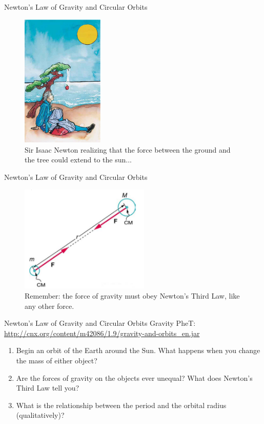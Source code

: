 \documentclass{beamer}
\begin{document}
\begin{frame}{Newton's Law of Gravity and Circular Orbits}
\begin{figure}
\centering
\includegraphics[width=0.35\textwidth]{figures/newton.png}
\caption{\label{fig:apple} Sir Isaac Newton realizing that the force between the ground and the tree could extend to the sun...}
\end{figure}
\end{frame}

\begin{frame}{Newton's Law of Gravity and Circular Orbits}
\begin{figure}
\centering
\includegraphics[width=0.55\textwidth]{figures/third.png}
\caption{\label{fig:third} Remember: the force of gravity must obey Newton's Third Law, like any other force.}
\end{figure}
\end{frame}

\begin{frame}{Newton's Law of Gravity and Circular Orbits}
Gravity PheT: \\
\url{http://cnx.org/content/m42086/1.9/gravity-and-orbits_en.jar}
\begin{enumerate}
\item Begin an orbit of the Earth around the Sun.  What happens when you change the mass of either object?
\item Are the forces of gravity on the objects ever unequal?  What does Newton's Third Law tell you?
\item What is the relationship between the period and the orbital radius (qualitatively)?
\end{enumerate}
\end{frame}
\end{document}
